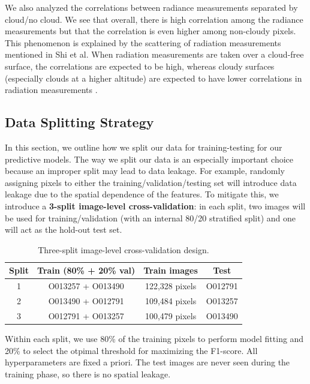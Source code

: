 \documentclass[11pt,letterpaper]{article}
\begin{document}
We also analyzed the correlations between radiance measurements separated by cloud/no cloud. We see that overall, there is high correlation among the radiance measurements but that the correlation is even higher among non-cloudy pixels. This phenomenon is explained by the scattering of radiation measurements mentioned in Shi et al. When radiation measurements are taken over a cloud-free surface, the correlations are expected to be high, whereas cloudy surfaces (especially clouds at a higher altitude) are expected to have lower correlations in radiation measurements \cite{Shi}.


\subsection{Data Splitting Strategy}

In this section, we outline how we split our data for training-testing for our predictive models. The way we split our data is an especially important choice because an improper split may lead to data leakage. For example, randomly assigning pixels to either the training/validation/testing set will introduce data leakage due to the spatial dependence of the features. To mitigate this, we introduce a \textbf{3-split image-level cross-validation}: in each split, two images will be used for training/validation (with an internal 80/20 stratified split) and one will act as the hold-out test set.

\begin{table}[h!]
\centering
\label{tab:cv_design}
\begin{tabular}{cccc}
\toprule
Split & Train (80\% + 20\% val) & Train images & Test \\
\midrule
1 & O013257 + O013490 & 122,328 pixels & O012791 \\
2 & O013490 + O012791 & 109,484 pixels & O013257 \\
3 & O012791 + O013257 & 100,479 pixels & O013490 \\
\bottomrule
\end{tabular}
\caption{Three-split image-level cross-validation design.}
\end{table}
\FloatBarrier

Within each split, we use 80\% of the training pixels to perform model fitting and 20\% to select the otpimal threshold for maximizing the F1-score. All hyperparameters are fixed a priori. The test images are never seen during the training phase, so there is no spatial leakage.
\end{document}

